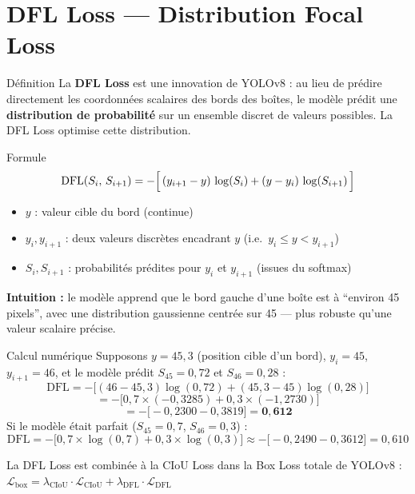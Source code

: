 \documentclass[12pt, a4paper]{report}
\begin{document}
\section{DFL Loss — Distribution Focal Loss}

\begin{definitionbox}{Définition}
  La \textbf{DFL Loss} est une innovation de YOLOv8 : au lieu de prédire
  directement les coordonnées scalaires des bords des boîtes, le modèle prédit
  une \textbf{distribution de probabilité} sur un ensemble discret de valeurs
  possibles. La DFL Loss optimise cette distribution.
\end{definitionbox}

\begin{formulebox}{Formule}
  \[
    \text{DFL}(S_i,\, S_{i+1}) =
    -\Bigl[\,(y_{i+1} - y)\,\log(S_i) + (y - y_i)\,\log(S_{i+1})\,\Bigr]
  \]
  \begin{itemize}
    \item $y$ : valeur cible du bord (continue)
    \item $y_i, y_{i+1}$ : deux valeurs discrètes encadrant $y$
          (i.e.\ $y_i \leq y < y_{i+1}$)
    \item $S_i, S_{i+1}$ : probabilités prédites pour $y_i$ et $y_{i+1}$
          (issues du softmax)
  \end{itemize}
\end{formulebox}

\textbf{Intuition :} le modèle apprend que le bord gauche d'une boîte est à
``environ 45 pixels'', avec une distribution gaussienne centrée sur 45 — plus
robuste qu'une valeur scalaire précise.

\begin{examplebox}{Calcul numérique}
  Supposons $y = 45{,}3$ (position cible d'un bord), $y_i = 45$, $y_{i+1} = 46$,
  et le modèle prédit $S_{45} = 0{,}72$ et $S_{46} = 0{,}28$ :
  \[
    \text{DFL} = -\bigl[(46-45{,}3)\log(0{,}72) + (45{,}3-45)\log(0{,}28)\bigr]
  \]
  \[
    = -\bigl[0{,}7 \times (-0{,}3285) + 0{,}3 \times (-1{,}2730)\bigr]
  \]
  \[
    = -\bigl[-0{,}2300 - 0{,}3819\bigr] = \mathbf{0{,}612}
  \]
  Si le modèle était parfait ($S_{45}=0{,}7$, $S_{46}=0{,}3$) :
  \[
    \text{DFL} = -\bigl[0{,}7 \times \log(0{,}7) + 0{,}3 \times \log(0{,}3)\bigr]
               \approx -\bigl[-0{,}2490 - 0{,}3612\bigr] = 0{,}610
  \]
\end{examplebox}

\begin{notebox}
  La DFL Loss est combinée à la CIoU Loss dans la Box Loss totale de YOLOv8 :
  $\mathcal{L}_{\text{box}} = \lambda_{\text{CIoU}} \cdot \mathcal{L}_{\text{CIoU}}
  + \lambda_{\text{DFL}} \cdot \mathcal{L}_{\text{DFL}}$
\end{notebox}
\end{document}
